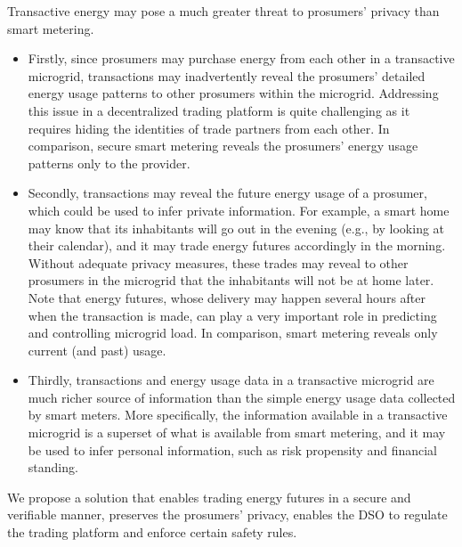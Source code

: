 Transactive energy may pose a much greater threat to prosumers' privacy than smart metering.
\begin{itemize}
\item Firstly, since prosumers may purchase energy from each other in a transactive microgrid, transactions may inadvertently reveal the prosumers' detailed energy usage patterns to other prosumers within the microgrid.
Addressing this issue in a decentralized trading platform is quite challenging as it requires hiding the identities of trade partners from each other.
In comparison, secure smart metering reveals the prosumers' energy usage patterns only to the provider. 
\item Secondly, transactions may reveal the future energy usage of a prosumer, which could be used to infer private information.
For example, a smart home may know that its inhabitants will go out in the evening (e.g., by looking at their calendar), and it may trade energy futures accordingly in the morning.
Without adequate privacy measures, these trades may reveal to other prosumers in the microgrid that the inhabitants will not be at home later.
Note that energy futures, whose delivery may happen several hours after when the transaction is made, can play a very important role in predicting and controlling microgrid load.
In comparison, smart metering reveals only current (and past) usage.
\item Thirdly, transactions and energy usage data in a transactive microgrid are much richer source of information than the simple energy usage data collected by smart meters.
More specifically, the information available in a transactive microgrid is a superset of what is available from smart metering, and it may be used to infer personal information, such as risk propensity and financial standing.
\end{itemize}

We propose a solution that enables trading energy futures in a secure and verifiable manner, preserves the prosumers' privacy, enables the DSO to regulate the trading platform and enforce certain safety rules.


